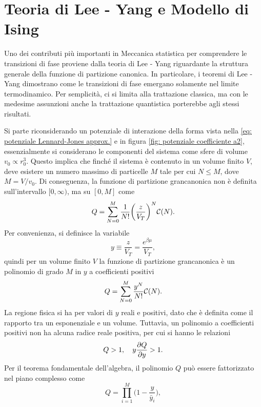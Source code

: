 \chapter{Teoria di Lee - Yang e Modello di Ising}
Uno dei contributi più importanti in Meccanica statistica per comprendere le transizioni di fase proviene dalla teoria di Lee - Yang riguardante la struttura generale della funzione di partizione canonica. In particolare, i teoremi di Lee - Yang dimostrano come le transizioni di fase emergano solamente nel limite termodinamico. Per semplicità, ci si limita alla trattazione classica, ma con le medesime assunzioni anche la trattazione quantistica porterebbe agli stessi risultati. 

Si parte riconsiderando un potenziale di interazione della forma vista nella \eqref{eq: potenziale Lennard-Jones approx.} e in figura \ref{fig: potenziale coefficiente a2}, essenzialmente si considerano le componenti del sistema come sfere di volume $v_0 \propto r_0^3$. Questo implica che finché il sistema è contenuto in un volume finito $V$, deve esistere un numero massimo di particelle $M$ tale per cui $N \le M$, dove $M = V/v_0$. Di conseguenza, la funzione di partizione grancanonica non è definita sull'intervallo $[0,\infty)$, ma su $[0,M]$ come
\begin{equation}
    Q = \sum_{N = 0}^M \frac{1}{N!}\bigg(\frac{z}{V_T}\bigg)^N\mathcal{C}(N).
\end{equation}
Per convenienza, si definisce la variabile 
\begin{equation}
    y \equiv \frac{z}{V_T} = \frac{e^{\beta\mu}}{V_T},
\end{equation}
quindi per un volume finito $V$ la funzione di partizione grancanonica è un polinomio di grado $M$ in $y$ a coefficienti positivi
\begin{equation}
\label{eq: funzione di partizione grancanonica LY}
    Q = \sum_{N = 0}^M \frac{y^N}{N!}\mathcal{C}(N).
\end{equation}
La regione fisica si ha per valori di $y$ reali e positivi, dato che è definita come il rapporto tra un esponenziale e un volume. Tuttavia, un polinomio a coefficienti positivi non ha alcuna radice reale positiva, per cui si hanno le relazioni
\begin{equation}
\label{eq: proprietà funzione di partizione grancanonica LY}
    Q > 1,\quad y\frac{\partial Q}{\partial y} > 1.
\end{equation}
Per il teorema fondamentale dell'algebra, il polinomio $Q$ può essere fattorizzato nel piano complesso come
\begin{equation}
    Q  = \prod_{i=1}^M\bigg(1 - \frac{y}{\bar{y}_i}\bigg),
\end{equation}
